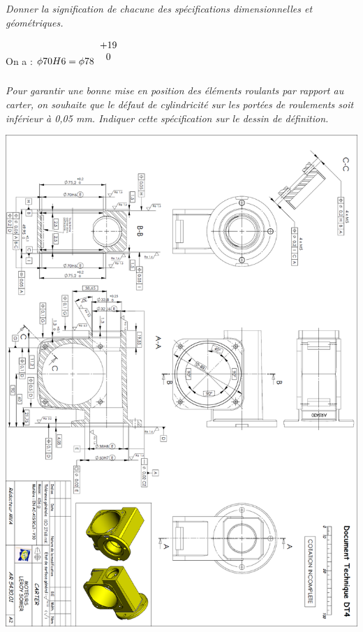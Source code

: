 \documentclass[10pt,fleqn]{article} %
\begin{document}
\begin{multicols}{2}
\subparagraph{}\textit{Donner la signification de chacune des spécifications dimensionnelles et géométriques.}

\begin{rem}
On a : $\phi 70 H6 = \phi 78 ^{\begin{tabular}{c}+19 \\ 0\end{tabular}}$
\end{rem}
\subparagraph{}\textit{Pour garantir une bonne mise en position des éléments roulants par rapport au carter, on souhaite que le défaut de cylindricité sur les portées de roulements soit inférieur à 0,05 mm. Indiquer cette spécification sur le dessin de définition.}
\end{multicols}

\begin{center}
\includegraphics[width=\textwidth]{images/reducteur_03}
\end{center}
\end{document}
